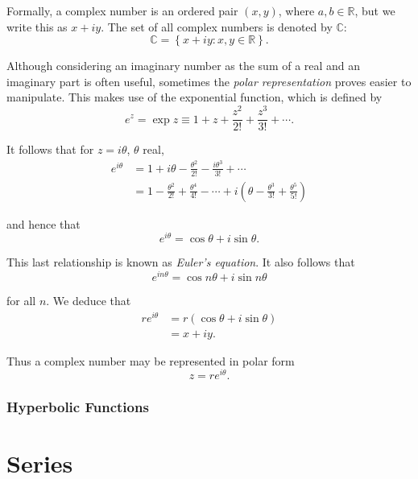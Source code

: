 \documentclass{article}
\newcommand{\R}{\mathbb{R}}
\begin{document}
Formally, a complex number is an ordered pair $\left( x, y \right)$, where $a, b \in \R$, but we write this as $x + iy$. The set of all complex numbers is denoted by $\mathbb{C}$:
\begin{equation*}
    \mathbb{C} = \left\{ x + iy : x, y \in \R \right\}.
\end{equation*}

Although considering an imaginary number as the sum of a real and an imaginary part is often useful, sometimes the \emph{polar representation} proves easier to manipulate. This makes use of the exponential function, which is defined by
\begin{equation*}
    e^z = \exp z \equiv 1 + z + \frac{z^2}{2!} + \frac{z^3}{3!} + \cdots.
\end{equation*}

It follows that for $z = i\theta$, $\theta$ real,
\begin{align*}
    e^{i\theta} &= 1 + i\theta - \frac{\theta^2}{2!} - \frac{i\theta^3}{3!} + \cdots \\
    &= 1 - \frac{\theta^2}{2!} + \frac{\theta^4}{4!} - \cdots + i \left( \theta - \frac{\theta^3}{3!} + \frac{\theta^5}{5!} \right)
\end{align*}

and hence that
\begin{equation*}
    e^{i\theta} = \cos{\theta} + i\sin{\theta}.
\end{equation*}

This last relationship is known as \emph{Euler's equation}. It also follows that
\begin{equation*}
    e^{in\theta} = \cos{n\theta} + i\sin{n\theta}
\end{equation*}

for all $n$. We deduce that
\begin{align*}
    re^{i\theta} &= r \left( \cos{\theta} + i\sin{\theta} \right) \\
    &= x + iy.
\end{align*}

Thus a complex number may be represented in polar form
\begin{equation*}
    z = re^{i\theta}.
\end{equation*}

\subsubsection{Hyperbolic Functions}

\section{Series}
\end{document}
